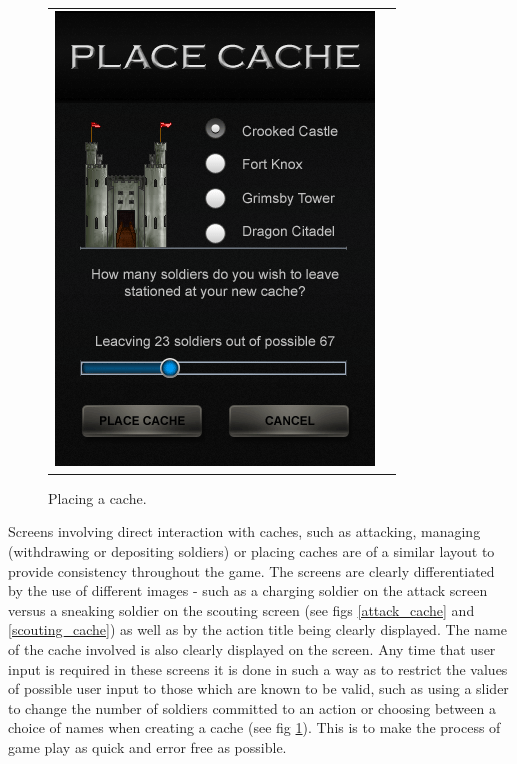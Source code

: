 \begin{figure}[h!]
\begin{tabular}{cc}
\begin{minipage}{0.3\textwidth}
\begin{center}
\begin{minipage}{0.83\textwidth}
		\includegraphics[width=\textwidth]{images/place_cache_mockup}
	\caption{Placing a cache.}
		\label{placing_cache}
		\end{minipage}
		\end{center}
	\end{minipage}
\end{tabular}
\vspace{-0pt}
\end{figure}

 Screens involving direct interaction with caches, such as attacking, managing (withdrawing or depositing soldiers) or placing caches are of a similar layout to provide consistency throughout the game. The screens are clearly differentiated by the use of different images - such as a charging soldier on the attack screen versus a sneaking soldier on the scouting screen (see figs \ref{attack_cache} and \ref{scouting_cache}) as well as by the action title being clearly displayed. The name of the cache involved is also clearly displayed on the screen. Any time that user input is required in these screens it is done in such a way as to restrict the values of possible user input to those which are known to be valid, such as using a slider to change the number of soldiers committed to an action or choosing between a choice of names when creating a cache (see fig \ref{placing_cache}). This is to make the process of game play as quick and error free as possible.

